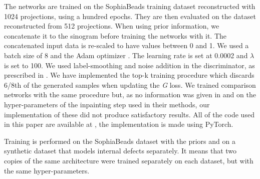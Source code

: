\documentclass[../main.tex]{subfiles}
\begin{document}
The networks are trained on the SophiaBeads training dataset reconstructed with 1024 projections, using a hundred epochs. They are then evaluated on the dataset reconstructed from 512 projections. When using prior information, we concatenate it to the sinogram before training the networks with it. The concatenated input data is re-scaled to have values between 0 and 1. We used a batch size of 8 and the Adam optimizer \cite{kingma2014Adam}. The learning rate is set at 0.0002 and $\lambda$ is set to 100. We used label-smoothing and noise addition in the discriminator, as prescribed in \cite{goodfellow2016nips}. We have implemented the top-k \cite{sinha2020top} training procedure which discards 6/8th of the generated samples when updating the \textit{G} loss. We trained comparison networks with the same procedure but, as no information was given in \cite{yoo2019sinogram} and \cite{yeh2016semantic} on the hyper-parameters of the inpainting step used in their methods, our implementation of these did not produce satisfactory results. All of the code used in this paper are available at \cite{valat2021codes}, the implementation is made using PyTorch.

Training is performed on the SophiaBeads dataset with the priors and on a synthetic dataset that models internal defects separately. It means that two copies of the same architecture were trained separately on each dataset, but with the same hyper-parameters.
\end{document}
